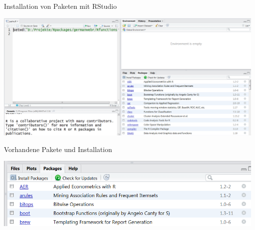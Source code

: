\documentclass[ignorenonframetext,]{beamer}
\begin{document}
\begin{frame}{Installation von Paketen mit RStudio}

\includegraphics{./tex2pdf.956/c6c143900ad8bf587abcf5f17c830e0628827a25.png}

\end{frame}

\begin{frame}{Vorhandene Pakete und Installation}

\includegraphics{./tex2pdf.956/0af3f1dcb1917a9b105b8ccb6be1cf1a459287cd.png}

\end{frame}
\end{document}
